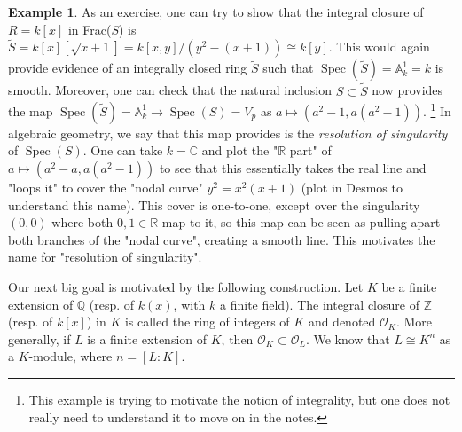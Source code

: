 \documentclass{tufte-handout} %
\theoremstyle{definition}
\newtheorem{exmp}[thm]{Example}
\theoremstyle{remark}
\newcommand{\R}{\mathbb{R}}
\newcommand{\Z}{\mathbb{Z}}
\renewcommand{\C}{\mathbb{C}}
\newcommand{\Q}{\mathbb{Q}}
\newcommand{\mO}{\mathcal{O}}
\DeclareMathOperator{\spec}{Spec}
\begin{document}
\begin{exmp}
	As an exercise, one can try to show that the integral closure of $R = k[x]$ in Frac($S$) is $\tilde{S} = k[x][\sqrt{x+1}] = k[x, y]/(y^2 - (x+1)) \cong k[y]$. This would again provide evidence of an integrally closed ring $\tilde{S}$ such that $\spec(\tilde{S}) = \mathbb{A}^1_k = k$ is smooth. Moreover, one can check that the natural inclusion $S \subset \tilde{S}$ now provides the map $\spec(\tilde{S}) = \mathbb{A}^1_k \to \spec(S) = V_p$ as $a \mapsto (a^2 - 1, a(a^2-1))$. \footnote{This example is trying to motivate the notion of integrality, but one does not really need to understand it to move on in the notes.} In algebraic geometry, we say that this map provides is the \emph{resolution of singularity} of $\spec(S)$. One can take $k = \C$ and plot the "$\R$ part" of $a \mapsto (a^2 - a, a(a^2 - 1))$ to see that this essentially takes the real line and "loops it" to cover the "nodal curve" $y^2 = x^2(x+1)$ (plot in Desmos to understand this name). This cover is one-to-one, except over the singularity $(0,0)$ where both $0, 1 \in \R$ map to it, so this map can be seen as pulling apart both branches of the "nodal curve", creating a smooth line. This motivates the name for "resolution of singularity".
\end{exmp}

Our next big goal is motivated by the following construction. Let $K$ be a finite extension of $\Q$ (resp. of $k(x)$, with $k$ a finite field). The integral closure of $\Z$ (resp. of $k[x]$) in $K$ is called the ring of integers of $K$ and denoted $\mO_K$. More generally, if $L$ is a finite extension of $K$, then $\mO_K \subset \mO_L$. We know that $L \cong K^n$ as a $K$-module, where $n = [L:K]$.
\end{document}
